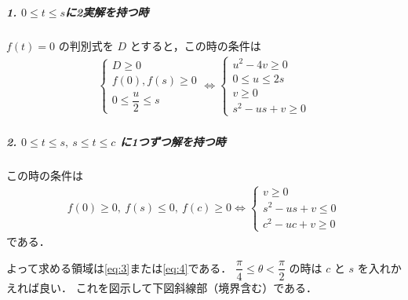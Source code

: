 \documentclass[../../main.tex]{subfiles}
\begin{document}
\subparagraph{1. $0\le t\le s$に2実解を持つ時}

$f(t)=0$ の判別式を $D$ とすると，この時の条件は
\begin{align}
  \begin{cases}
    D\ge0 \\
    f(0), f(s)\ge0 \\
    0\le \dfrac{u}{2}\le s
  \end{cases}
  \iff
  \begin{cases}
    u^2-4v\ge0 \\
    0\le u\le 2s \\
    v\ge0 \\
    s^2-us+v\ge0
  \end{cases} \label{eq:3}
\end{align}

\subparagraph{2. $0\le t\le s,\ s\le t\le c$ に1つずつ解を持つ時}

この時の条件は
\begin{align}
  f(0)\ge0,\ f(s)\le0,\ f(c)\ge0
  \iff
  \begin{cases}
    v\ge0 \\
    s^2-us+v\le0 \\
    c^2-uc+v\ge0
  \end{cases} \label{eq:4}
\end{align}
である．
\casesend

よって求める領域は\cref{eq:3}または\cref{eq:4}である．
$\dfrac{\pi}{4}\le\theta<\dfrac{\pi}{2}$ の時は $c$ と $s$ を入れかえれば良い．
これを図示して下図斜線部（境界含む）である．
\end{document}
